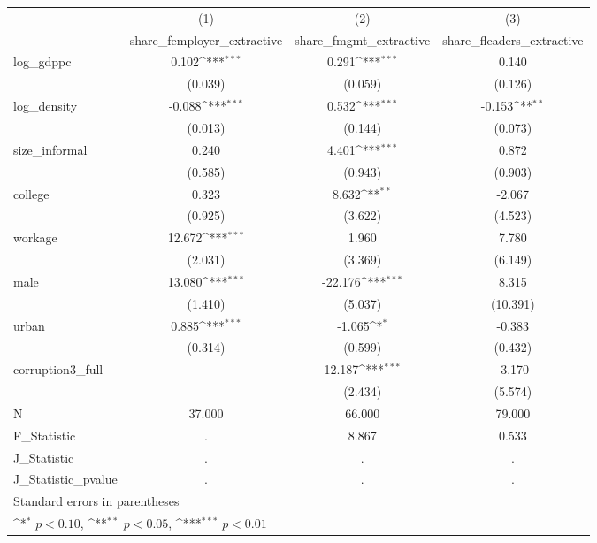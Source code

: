 {
\def\sym#1{\ifmmode^{#1}\else\(^{#1}\)\fi}
\begin{tabular}{l*{3}{c}}
\hline\hline
            &\multicolumn{1}{c}{(1)}&\multicolumn{1}{c}{(2)}&\multicolumn{1}{c}{(3)}\\
            &\multicolumn{1}{c}{share\_femployer\_extractive}&\multicolumn{1}{c}{share\_fmgmt\_extractive}&\multicolumn{1}{c}{share\_fleaders\_extractive}\\
\hline
log\_gdppc   &       0.102\sym{***}&       0.291\sym{***}&       0.140         \\
            &     (0.039)         &     (0.059)         &     (0.126)         \\
[1em]
log\_density &      -0.088\sym{***}&       0.532\sym{***}&      -0.153\sym{**} \\
            &     (0.013)         &     (0.144)         &     (0.073)         \\
[1em]
size\_informal&       0.240         &       4.401\sym{***}&       0.872         \\
            &     (0.585)         &     (0.943)         &     (0.903)         \\
[1em]
college     &       0.323         &       8.632\sym{**} &      -2.067         \\
            &     (0.925)         &     (3.622)         &     (4.523)         \\
[1em]
workage     &      12.672\sym{***}&       1.960         &       7.780         \\
            &     (2.031)         &     (3.369)         &     (6.149)         \\
[1em]
male        &      13.080\sym{***}&     -22.176\sym{***}&       8.315         \\
            &     (1.410)         &     (5.037)         &    (10.391)         \\
[1em]
urban       &       0.885\sym{***}&      -1.065\sym{*}  &      -0.383         \\
            &     (0.314)         &     (0.599)         &     (0.432)         \\
[1em]
corruption3\_full&                     &      12.187\sym{***}&      -3.170         \\
            &                     &     (2.434)         &     (5.574)         \\
\hline
N           &      37.000         &      66.000         &      79.000         \\
F\_Statistic &           .         &       8.867         &       0.533         \\
J\_Statistic &           .         &           .         &           .         \\
J\_Statistic\_pvalue&           .         &           .         &           .         \\
\hline\hline
\multicolumn{4}{l}{\footnotesize Standard errors in parentheses}\\
\multicolumn{4}{l}{\footnotesize \sym{*} \(p<0.10\), \sym{**} \(p<0.05\), \sym{***} \(p<0.01\)}\\
\end{tabular}
}
